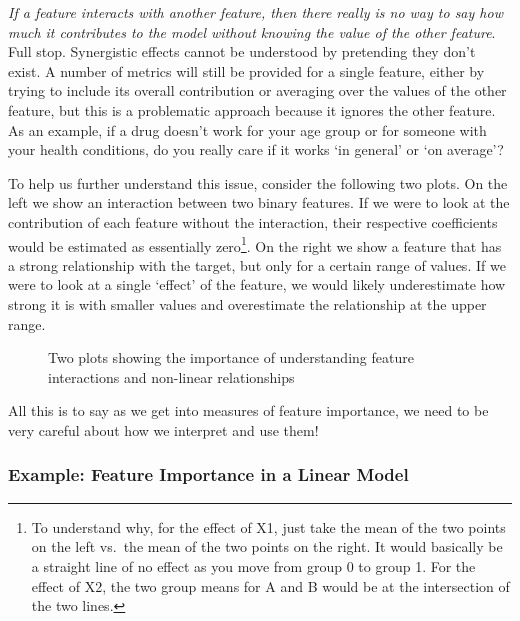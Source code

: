 \documentclass[
  letterpaper,
]{krantz}
\begin{document}
\emph{If a feature interacts with another feature, then there really is
no way to say how much it contributes to the model without knowing the
value of the other feature}. Full stop. Synergistic effects cannot be
understood by pretending they don't exist. A number of metrics will
still be provided for a single feature, either by trying to include its
overall contribution or averaging over the values of the other feature,
but this is a problematic approach because it ignores the other feature.
As an example, if a drug doesn't work for your age group or for someone
with your health conditions, do you really care if it works `in general'
or `on average'?

To help us further understand this issue, consider the following two
plots. On the left we show an interaction between two binary features.
If we were to look at the contribution of each feature without the
interaction, their respective coefficients would be estimated as
essentially zero\footnote{To understand why, for the effect of X1, just
  take the mean of the two points on the left vs.~the mean of the two
  points on the right. It would basically be a straight line of no
  effect as you move from group 0 to group 1. For the effect of X2, the
  two group means for A and B would be at the intersection of the two
  lines.}. On the right we show a feature that has a strong relationship
with the target, but only for a certain range of values. If we were to
look at a single `effect' of the feature, we would likely underestimate
how strong it is with smaller values and overestimate the relationship
at the upper range.

\begin{figure}[H]


\caption{\label{fig-feature-importance}Two plots showing the importance
of understanding feature interactions and non-linear relationships}

\end{figure}%

All this is to say as we get into measures of feature importance, we
need to be very careful about how we interpret and use them!

\subsubsection{Example: Feature Importance in a Linear
Model}\label{example-feature-importance-in-a-linear-model}
\end{document}
